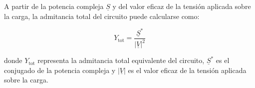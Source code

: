 A partir de la potencia compleja $\underline{S}$ y del valor eficaz de la tensión aplicada sobre la carga, la admitancia total del circuito puede calcularse como:

\begin{equation}
Y_{\text{tot}}=\frac{\underline{S}^{*}}{|\underline{V}|^2}
\label{eq:Ytot}
\end{equation}

donde $Y_{\text{tot}}$ representa la admitancia total equivalente del circuito, $\underline{S}^{*}$ es el conjugado de la potencia compleja y $|\underline{V}|$ es el valor eficaz de la tensión aplicada sobre la carga.
\newpage